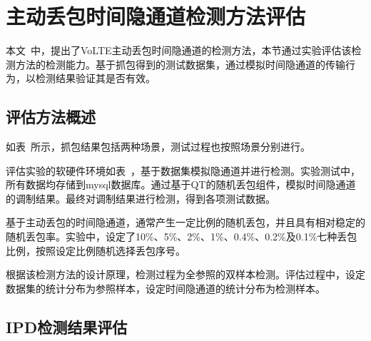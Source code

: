 \section{主动丢包时间隐通道检测方法评估}
\label{chap:analyze:result}

本文\ 中，提出了VoLTE主动丢包时间隐通道的检测方法，本节通过实验评估该检测方法的检测能力。基于抓包得到的测试数据集，通过模拟时间隐通道的传输行为，以检测结果验证其是否有效。

\subsection{评估方法概述}
\label{chap:analyze:result:abstract}

如表\ 所示，抓包结果包括两种场景，测试过程也按照场景分别进行。


评估实验的软硬件环境如表\ ，基于数据集模拟隐通道并进行检测。实验测试中，所有数据均存储到mysql数据库。通过基于QT的随机丢包组件，模拟时间隐通道的调制结果。最终对调制结果进行检测，得到各项测试数据。

基于主动丢包的时间隐通道，通常产生一定比例的随机丢包，并且具有相对稳定的随机丢包率。实验中，设定了10\%、5\%、2\%、1\%、0.4\%、0.2\%及0.1\%七种丢包比例，按照设定比例随机选择丢包序号。

根据该检测方法的设计原理，检测过程为全参照的双样本检测。评估过程中，设定数据集的统计分布为参照样本，设定时间隐通道的统计分布为检测样本。

\subsection{IPD检测结果评估}
\label{chap:analyze:result:ipd}

